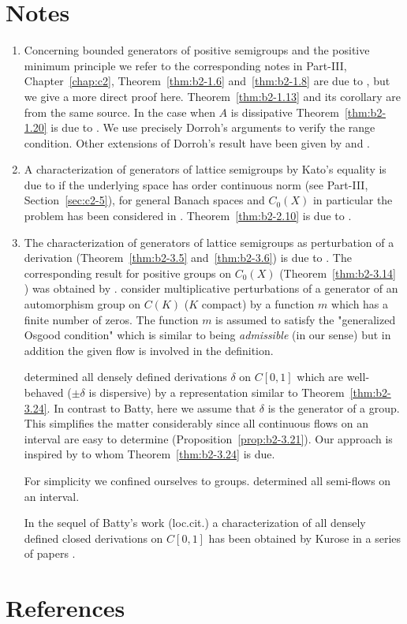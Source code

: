 \section*{Notes}
\label{notes:b2}
\begin{enumerate}[label=\emph{Section \arabic*:}, wide]

\item
Concerning bounded generators of positive semigroups and the positive minimum principle we refer to the corresponding notes in Part-III, Chapter~\ref{chap:c2},  Theorem~\ref{thm:b2-1.6} and~\ref{thm:b2-1.8} are due to \textcite{arendtchernoffkato:1982}, but we give a more direct proof here.
Theorem~\ref{thm:b2-1.13} and its corollary are from the same source.
In the case when $A$ is dissipative Theorem~\ref{thm:b2-1.20} is due to \textcite{dorroh:1966}.
We use precisely Dorroh's arguments to verify the range condition.
Other extensions of Dorroh's result have been given by \textcite{lumer:1974} and \textcite{lumer:1975}.

\item 
A characterization of generators of lattice semigroups by Kato's equality is due to  \textcite{nageluhlig:1981} if the underlying space has order continuous norm (see Part-III, Section~\ref{sec:c2-5}), for general Banach spaces and $C_{0}(X)$ in particular the problem has been considered in \textcite{arendt:1982}.
Theorem~\ref{thm:b2-2.10} is due to \textcite{uhlig:1979}.

\item
The characterization of generators of lattice semigroups as perturbation of a derivation (Theorem~\ref{thm:b2-3.5} and~\ref{thm:b2-3.6}) is due to \textcite{derndingernagel:1979}.
The corresponding result for positive groups on $C_{0}(X)$ (Theorem~\ref{thm:b2-3.14} ) was obtained by \textcite{arendtgreiner:1984}.
\textcite{linetal:1977} consider multiplicative perturbations of a generator of an automorphism group on $C(K)$ ($K$ compact) by a function $m$ which has a finite number of zeros.
The function $m$ is assumed to satisfy the "generalized Osgood condition" which is similar to being \emph{admissible} (in our sense) but in addition the given flow is involved in the definition.

\textcite{batty:1981} determined all densely defined derivations $\delta$ on $C[0,1]$ which are well-behaved (\ie  $\pm\delta$ is dispersive) by a representation similar to Theorem~\ref{thm:b2-3.24}.
In contrast to Batty, here we assume that $\delta$ is the generator of a group.
This simplifies the matter considerably since all continuous flows on an interval are easy to determine (Proposition~\ref{prop:b2-3.21}).
Our approach is inspired by \textcite{delaubenfels:1984} to whom Theorem~\ref{thm:b2-3.24} is due.

For simplicity we confined ourselves to groups.
\textcite{uhlig:1979} determined all semi-flows on an interval.

In the sequel of Batty's work (loc.cit.) a characterization of all densely defined closed derivations on $C[0,1]$ has been obtained by Kurose in a series of papers 
\textcite{kurose:1981, kurose:1982, kurose:1983}.
\end{enumerate}
\section*{References}
{\RaggedRight
  \printbibliography[heading=none]
 }
